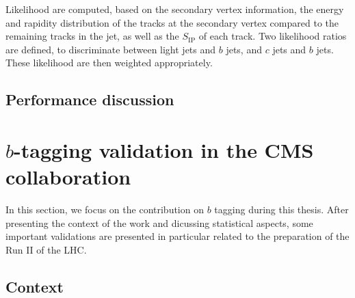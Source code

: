     Likelihood are computed, based on the secondary vertex information, the energy
    and rapidity distribution of the tracks at the secondary vertex compared to the remaining
    tracks in the jet, as well as the $S_\text{IP}$ of each track. Two likelihood ratios
    are defined, to discriminate between light jets and $b$ jets, and $c$ jets and $b$ jets.
    These likelihood are then weighted appropriately.


    \subsection{Performance discussion}


    \section{$b$-tagging validation in the CMS collaboration \label{sec:bTagValidation}}

    In this section, we focus on the contribution on $b$ tagging during this thesis.
    After presenting the context of the work and dicussing statistical aspects, some
    important validations are presented in particular related to the preparation of the
    Run II of the LHC.

        \subsection{Context}

